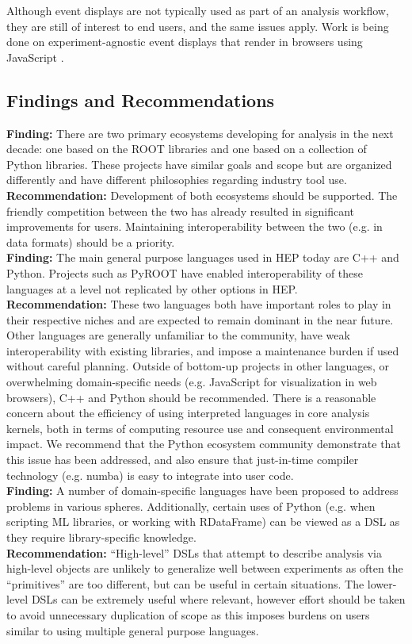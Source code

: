 Although event displays are not typically used as part of an analysis workflow, they are still of interest to end users, and the same issues apply. Work is being done on experiment-agnostic event displays that render in browsers using JavaScript \cite{Phoenix}.

\subsection{Findings and Recommendations}
\textbf{Finding:} There are two primary ecosystems developing for analysis in the next decade: one based on the ROOT libraries and one based on a collection of Python libraries. These projects have similar goals and scope but are organized differently and have different philosophies regarding industry tool use.\\
\textbf{Recommendation:} Development of both ecosystems should be supported. The friendly competition between the two has already resulted in significant improvements for users. Maintaining interoperability between the two (e.g. in data formats) should be a priority.\\

\textbf{Finding:} The main general purpose languages used in HEP today are C++ and Python. Projects such as PyROOT have enabled interoperability of these languages at a level not replicated by other options in HEP.\\
\textbf{Recommendation:} These two languages both have important roles to play in their respective niches and are expected to remain dominant in the near future. Other languages are generally unfamiliar to the community, have weak interoperability with existing libraries, and impose a maintenance burden if used without careful planning. Outside of bottom-up projects in other languages, or overwhelming domain-specific needs (e.g. JavaScript for visualization in web browsers), C++ and Python should be recommended. There is a reasonable concern about the efficiency of using interpreted languages in core analysis kernels, both in terms of computing resource use and consequent environmental impact. We recommend that the Python ecosystem community demonstrate that this issue has been addressed, and also ensure that just-in-time compiler technology (e.g. numba) is easy to integrate into user code.\\

\textbf{Finding:} A number of domain-specific languages have been proposed to address problems in various spheres. Additionally, certain uses of Python (e.g. when scripting ML libraries, or working with RDataFrame) can be viewed as a DSL as they require library-specific knowledge.\\
\textbf{Recommendation:} ``High-level'' DSLs that attempt to describe analysis via high-level objects are unlikely to generalize well between experiments as often the ``primitives'' are too different, but can be useful in certain situations. The lower-level DSLs can be extremely useful where relevant, however effort should be taken to avoid unnecessary duplication of scope as this imposes burdens on users similar to using multiple general purpose languages.\\

